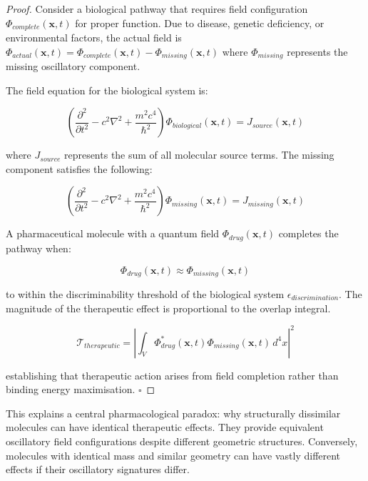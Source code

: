\documentclass{article}
\theoremstyle{definition}
\theoremstyle{remark}
\begin{document}
\begin{proof}
Consider a biological pathway that requires field configuration $\Phi_{complete}(\mathbf{x},t)$ for proper function. Due to disease, genetic deficiency, or environmental factors, the actual field is $\Phi_{actual}(\mathbf{x},t) = \Phi_{complete}(\mathbf{x},t) - \Phi_{missing}(\mathbf{x},t)$ where $\Phi_{missing}$ represents the missing oscillatory component.

The field equation for the biological system is:

\begin{equation}
\left(\frac{\partial^2}{\partial t^2} - c^2\nabla^2 + \frac{m^2c^4}{\hbar^2}\right)\Phi_{biological}(\mathbf{x},t) = J_{source}(\mathbf{x},t)
\label{eq:field_equation}
\end{equation}

where $J_{source}$ represents the sum of all molecular source terms. The missing component satisfies the following:

\begin{equation}
\left(\frac{\partial^2}{\partial t^2} - c^2\nabla^2 + \frac{m^2c^4}{\hbar^2}\right)\Phi_{missing}(\mathbf{x},t) = J_{missing}(\mathbf{x},t)
\end{equation}

A pharmaceutical molecule with a quantum field $\Phi_{drug}(\mathbf{x},t)$ completes the pathway when:

\begin{equation}
\Phi_{drug}(\mathbf{x},t) \approx \Phi_{missing}(\mathbf{x},t)
\end{equation}

to within the discriminability threshold of the biological system $\epsilon_{discrimination}$. The magnitude of the therapeutic effect is proportional to the overlap integral.

\begin{equation}
\mathcal{T}_{therapeutic} = \left| \int_{V} \Phi_{drug}^*(\mathbf{x},t) \Phi_{missing}(\mathbf{x},t) \, d^4x \right|^2
\end{equation}

establishing that therapeutic action arises from field completion rather than binding energy maximisation. $\square$
\end{proof}

This explains a central pharmacological paradox: why structurally dissimilar molecules can have identical therapeutic effects. They provide equivalent oscillatory field configurations despite different geometric structures. Conversely, molecules with identical mass and similar geometry can have vastly different effects if their oscillatory signatures differ.
\end{document}

